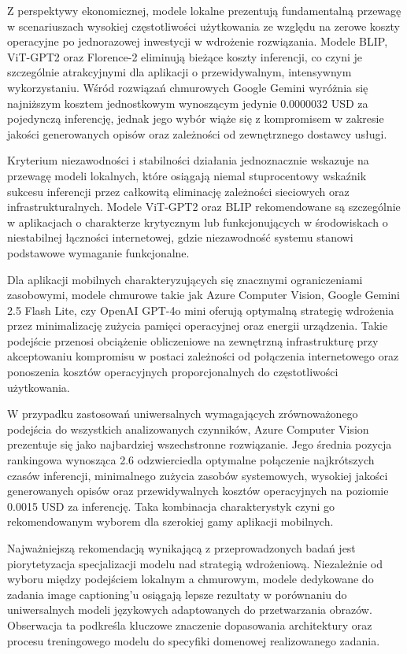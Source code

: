 Z perspektywy ekonomicznej, modele lokalne prezentują fundamentalną przewagę w scenariuszach wysokiej częstotliwości użytkowania ze względu na zerowe koszty operacyjne
po jednorazowej inwestycji w wdrożenie rozwiązania. Modele BLIP, ViT-GPT2 oraz Florence-2 eliminują bieżące koszty inferencji, co czyni je szczególnie atrakcyjnymi
dla aplikacji o przewidywalnym, intensywnym wykorzystaniu. Wśród rozwiązań chmurowych Google Gemini wyróżnia się najniższym kosztem jednostkowym wynoszącym jedynie 0.0000032 USD 
za pojedynczą inferencję, jednak jego wybór wiąże się z kompromisem w zakresie jakości generowanych opisów oraz zależności od zewnętrznego dostawcy usługi.

Kryterium niezawodności i stabilności działania jednoznacznie wskazuje na przewagę modeli lokalnych, które osiągają niemal stuprocentowy wskaźnik sukcesu inferencji 
przez całkowitą eliminację zależności sieciowych oraz infrastrukturalnych. Modele ViT-GPT2 oraz BLIP rekomendowane są szczególnie w aplikacjach o charakterze krytycznym 
lub funkcjonujących w środowiskach o niestabilnej łączności internetowej, gdzie niezawodność systemu stanowi podstawowe wymaganie funkcjonalne.

Dla aplikacji mobilnych charakteryzujących się znacznymi ograniczeniami zasobowymi, modele chmurowe takie jak Azure Computer Vision, Google Gemini 2.5 Flash Lite, czy OpenAI GPT-4o mini oferują optymalną strategię wdrożenia 
przez minimalizację zużycia pamięci operacyjnej oraz energii urządzenia. Takie podejście przenosi obciążenie obliczeniowe na zewnętrzną infrastrukturę przy akceptowaniu kompromisu w postaci zależności od połączenia internetowego
oraz ponoszenia kosztów operacyjnych proporcjonalnych do częstotliwości użytkowania.

W przypadku zastosowań uniwersalnych wymagających zrównoważonego podejścia do wszystkich analizowanych czynników, Azure Computer Vision prezentuje się jako najbardziej wszechstronne rozwiązanie. 
Jego średnia pozycja rankingowa wynosząca 2.6 odzwierciedla optymalne połączenie najkrótszych czasów inferencji, minimalnego zużycia zasobów systemowych, wysokiej jakości generowanych opisów oraz przewidywalnych kosztów operacyjnych na poziomie 0.0015 USD za inferencję. 
Taka kombinacja charakterystyk czyni go rekomendowanym wyborem dla szerokiej gamy aplikacji mobilnych.

Najważniejszą rekomendacją wynikającą z przeprowadzonych badań jest piorytetyzacja specjalizacji modelu nad strategią wdrożeniową. 
Niezależnie od wyboru między podejściem lokalnym a chmurowym, modele dedykowane do zadania image captioning'u
osiągają lepsze rezultaty w porównaniu do uniwersalnych modeli językowych adaptowanych do przetwarzania obrazów. 
Obserwacja ta podkreśla kluczowe znaczenie dopasowania architektury oraz procesu treningowego modelu do specyfiki domenowej realizowanego zadania.